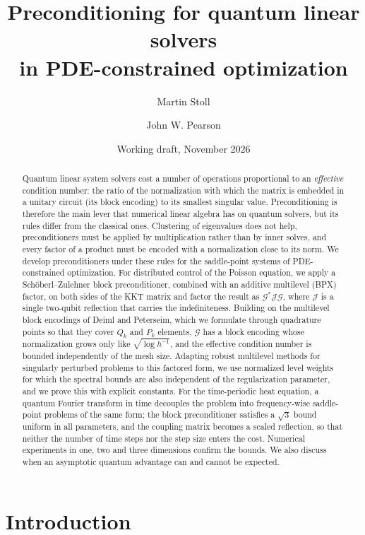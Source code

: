 \documentclass[11pt,a4paper]{article}
\title{Preconditioning for quantum linear solvers\\ in PDE-constrained optimization}
\author{Martin Stoll \and John W. Pearson}
\date{Working draft, November 2026}
\newcommand{\G}{\mathcal{G}}
\newcommand{\J}{\mathcal{J}}
\theoremstyle{remark}
\begin{document}
\maketitle

\begin{abstract}
Quantum linear system solvers cost a number of operations proportional to an
\emph{effective} condition number: the ratio of the normalization with which
the matrix is embedded in a unitary circuit (its block encoding) to its
smallest singular value. Preconditioning is therefore the main lever that
numerical linear algebra has on quantum solvers, but its rules differ from
the classical ones. Clustering of eigenvalues does not help, preconditioners
must be applied by multiplication rather than by inner solves, and every
factor of a product must be encoded with a normalization close to its norm.
We develop preconditioners under these rules for the saddle-point systems
of PDE-constrained optimization. For distributed control of the Poisson
equation, we apply a Sch\"oberl--Zulehner block preconditioner, combined
with an additive multilevel (BPX) factor, on both sides of the KKT matrix
and factor the result as $\G^*\J\G$, where $\J$ is a single two-qubit
reflection that carries the indefiniteness. Building on the multilevel
block encodings of Deiml and Peterseim, which we formulate through
quadrature points so that they cover $Q_k$ and $P_k$ elements, $\G$ has a
block encoding whose normalization grows only like $\sqrt{\log h^{-1}}$, and the
effective condition number is bounded independently of the mesh size.
Adapting robust multilevel methods for singularly perturbed problems to
this factored form, we use normalized level weights for which the spectral
bounds are also independent of the regularization parameter, and we prove
this with explicit constants. For the time-periodic heat equation, a
quantum Fourier transform in time decouples the problem into
frequency-wise saddle-point problems of the same form; the block
preconditioner satisfies a $\sqrt3$ bound uniform in all parameters, and the
coupling matrix becomes a scaled reflection, so that neither the number of
time steps nor the step size enters the cost. Numerical experiments in one,
two and three dimensions confirm the bounds. We also discuss when an
asymptotic quantum advantage can and cannot be expected.
\end{abstract}

\section{Introduction}\label{sec:intro}
\end{document}
